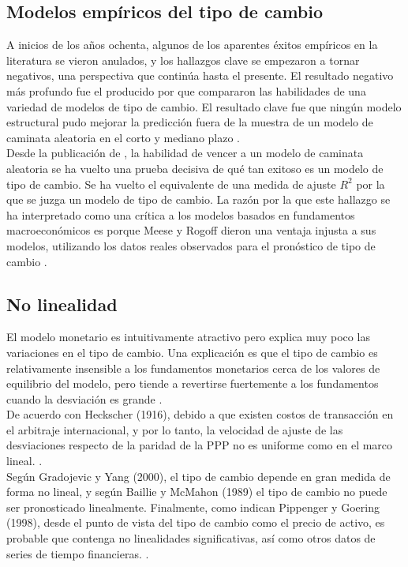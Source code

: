 	
	\subsection{Modelos empíricos del tipo de cambio}
	A inicios de los años ochenta, algunos de los aparentes éxitos empíricos en la literatura se vieron anulados, y los hallazgos clave se empezaron a tornar negativos, una perspectiva que continúa hasta el presente. El resultado negativo más profundo fue el producido por \textcite{meese1983empirical} que compararon las habilidades de una variedad de modelos de tipo de cambio. El resultado clave fue que ningún modelo estructural pudo mejorar la predicción fuera de la muestra de un modelo de caminata aleatoria en el corto y mediano plazo \parencite{frankelrose1994survey}.\\
	
	Desde la publicación de \textcite{meese1983empirical}, la habilidad de vencer a un modelo de caminata aleatoria se ha vuelto una prueba decisiva de qué tan exitoso es un modelo de tipo de cambio. Se ha vuelto el equivalente de una medida de ajuste $R^2$ por la que se juzga un modelo de tipo de cambio. La razón por la que este hallazgo se ha interpretado como una crítica a los modelos basados en fundamentos macroeconómicos es porque Meese y Rogoff dieron una ventaja injusta a sus modelos, utilizando los datos reales observados para el pronóstico de tipo de cambio \parencite{exchecon}.
	
	
	\subsection{No linealidad}
	
	El modelo monetario es intuitivamente atractivo pero explica muy poco las variaciones en el tipo de cambio. Una explicación es que el tipo de cambio es relativamente insensible a los fundamentos monetarios cerca de los valores de equilibrio del modelo, pero tiende a revertirse fuertemente a los fundamentos cuando la desviación es grande \parencite{neely2002well}.\\
	
	De acuerdo con Heckscher (1916), debido a que existen costos de transacción en el arbitraje internacional, y por lo tanto, la velocidad de ajuste de las desviaciones respecto de la paridad de la PPP no es uniforme como en el marco lineal. \parencite{taylor2004pppdebate}.\\
	
	Según Gradojevic y Yang (2000), el tipo de cambio depende en gran medida de forma no lineal, y según Baillie y McMahon (1989) el tipo de cambio no puede ser pronosticado linealmente. Finalmente, como indican Pippenger y Goering (1998), desde el punto de vista del tipo de cambio como el precio de activo, es probable que contenga no linealidades significativas, así como otros datos de series de tiempo financieras. \parencite[Citado en ][9]{sunythesis}.
